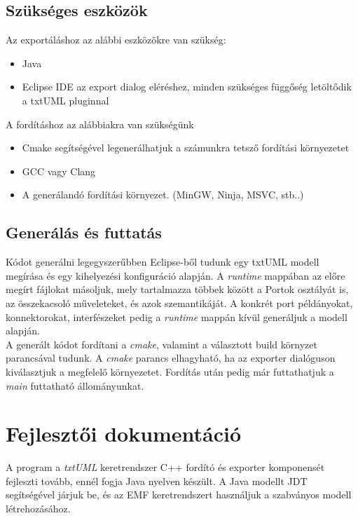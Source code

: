 \documentclass[a4paper,12pt]{report}
\begin{document}
\subsection{Szükséges eszközök}
Az exportáláshoz az alábbi eszközökre van szükség:
\begin{itemize}
\item Java
\item Eclipse IDE az export dialog eléréshez, minden szükséges függőség letöltődik a txtUML pluginnal
\end{itemize}

A fordításhoz az alábbiakra van szükségünk
\begin{itemize}
\item Cmake segítségével legenerálhatjuk a számunkra tetsző fordítási környezetet
\item GCC vagy Clang
\item A generálandó fordítási környezet. (MinGW, Ninja, MSVC, stb..)
\end{itemize}

\subsection{Generálás és futtatás}
Kódot generálni legegyszerűbben Eclipse-ből tudunk egy txtUML modell megírása és egy kihelyezési konfiguráció alapján. A \textit{runtime} mappában az előre megírt fájlokat másoljuk, mely tartalmazza többek között a Portok osztályát is, az összekacsoló műveleteket, és azok szemantikáját. A konkrét port példányokat, konnektorokat, interfészeket pedig a \textit{runtime} mappán kívül generáljuk a modell alapján. \\

A generált kódot fordítani a \textit{cmake}, valamint a választott build környzet parancsával tudunk. A \textit{cmake} parancs elhagyható, ha az exporter dialóguson kiválasztjuk a megfelelő környezetet. Fordítás után pedig már futtathatjuk a \textit{main} futtatható állományunkat.

\section{Fejlesztői dokumentáció}
A program a \textit{txtUML} keretrendszer C++ fordító és exporter komponensét fejleszti tovább, ennél fogja Java nyelven készült. A Java modellt JDT segítségével járjuk be, és az EMF keretrendszert használjuk a szabványos modell létrehozásához. \\
\end{document}
